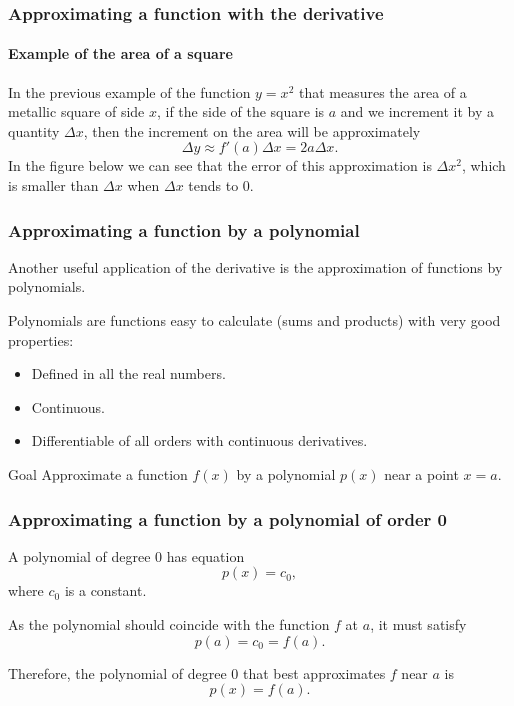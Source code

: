 \begin{frame}
\frametitle{Approximating a function with the derivative}
\framesubtitle{Example of the area of a square}
In the previous example of the function $y=x^2$ that measures the area of a metallic square of side $x$, if the side of the square is $a$ and we increment it by a quantity $\Delta x$, then the increment on the area will be approximately
\[
\Delta y \approx f'(a)\Delta x = 2a\Delta x.
\]
In the figure below we can see that the error of this approximation is $\Delta x^2$, which is smaller than $\Delta x$ when $\Delta x$ tends to 0. 
\begin{center}
\end{center}
\end{frame}


\begin{frame}
\frametitle{Approximating a function by a polynomial}
Another useful application of the derivative is the approximation of functions by polynomials.

Polynomials are functions easy to calculate (sums and products) with very good properties:
\begin{itemize}
\item Defined in all the real numbers.
\item Continuous.
\item Differentiable of all orders with continuous derivatives.
\end{itemize}

\begin{block}{Goal}
Approximate a function $f(x)$ by a polynomial $p(x)$ near a point $x=a$.
\end{block}
\end{frame}


\begin{frame}
\frametitle{Approximating a function by a polynomial of order 0}
A polynomial of degree 0 has equation
\[
p(x) = c_0,
\]
where $c_0$ is a constant.

As the polynomial should coincide with the function $f$ at $a$, it must satisfy
\[p(a) = c_0 = f(a).\]

Therefore, the polynomial of degree 0 that best approximates $f$ near $a$ is
\[p(x) = f(a).\]
\end{frame}


